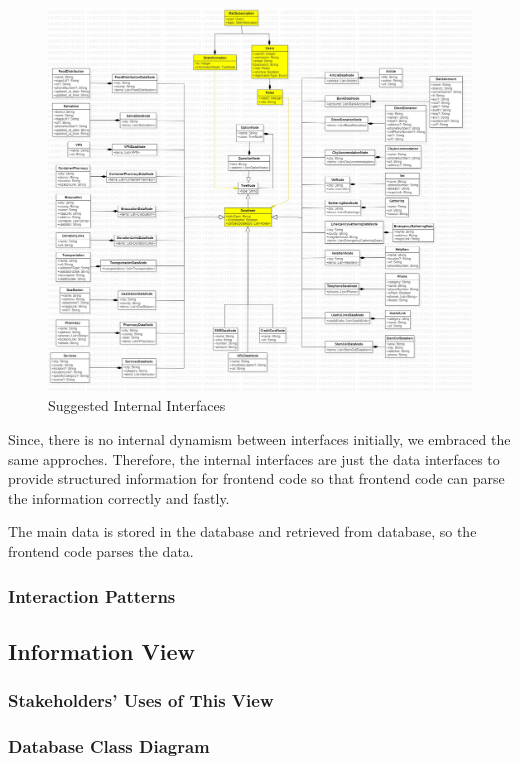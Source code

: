 \begin{figure}[H]
  \centering
  \includegraphics[width=\linewidth]{img/internal-interfaces-diagram-s5.jpg}
  \caption{Suggested Internal Interfaces}
\end{figure}


Since, there is no internal dynamism between interfaces initially, we embraced the same approches. Therefore, the internal interfaces are just the data interfaces to provide structured information for frontend code so that frontend code can parse the information correctly and fastly.

The main data is stored in the database and retrieved from database, so the frontend code parses the data.

\subsubsection{Interaction Patterns}

\subsection{Information View}

\subsubsection{Stakeholders' Uses of This View}

\subsubsection{Database Class Diagram}

